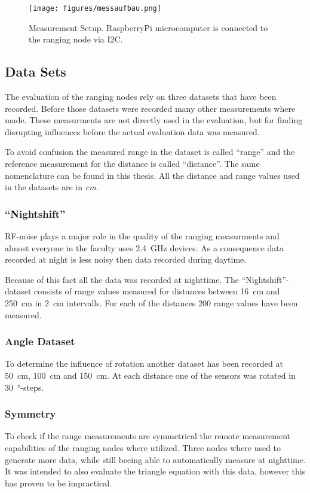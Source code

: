 \begin{figure}[H]
	\centering
	\texttt{[image: figures/messaufbau.png]}
	\caption[ Measurement Setup ]{ Measurement Setup. RaspberryPi microcomputer is connected to the ranging node via I2C. }
	\label{aufbau}
\end{figure}

\subsection{Data Sets}

The evaluation of the ranging nodes rely on three datasets that have been recorded.
Before those datasets were recorded many other measurements where made.
These measurments are not directly used in the evaluation, but for finding disrupting influences before the actual evaluation data was measured.

To avoid confusion the measured range in the dataset is called \enquote{range} and the reference measurement for the distance is called \enquote{distance}.
The same nomenclature can be found in this thesis.
All the distance and range values used in the datasets are in \emph{cm}.

\subsubsection*{\enquote{Nightshift}}
RF-noise plays a major role in the quality of the ranging measurments and almost everyone in the faculty uses \SI{2.4}{GHz} devices.
As a consequence data recorded at night is less noisy then data recorded during daytime.

Because of this fact all the data was recorded at nighttime.
The \enquote{Nightshift}-dataset consists of range values measured for distances between \SI{16}{cm} and \SI{250}{cm} in \SI{2}{cm} intervalls.
For each of the distances 200 range values have been measured.

\subsubsection*{Angle Dataset}
To determine the influence of rotation another dataset has been recorded at \SI{50}{cm}, \SI{100}{cm} and \SI{150}{cm}.
At each distance one of the sensors was rotated in \SI{30}{\degree}-steps.

\subsubsection*{Symmetry}
To check if the range measurements are symmetrical the remote measurement capabilities of the ranging nodes where utilized.
Three nodes where used to generate more data, while still beeing able to automatically measure at nighttime.
It was intended to also evaluate the triangle equation with this data, however this has proven to be impractical.

